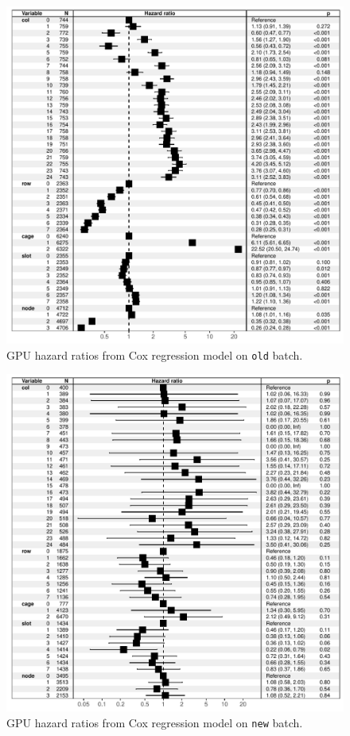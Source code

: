 \begin{figure}
  \includegraphics[width=6.5in]{figs/cox_o001.pdf}
  \caption{GPU hazard ratios from Cox regression model on {\tt old}
    batch.}
\end{figure}
\begin{figure}
  \includegraphics[width=6.5in]{figs/cox_n001.pdf}
  \caption{GPU hazard ratios from Cox regression model on {\tt new}
    batch.}
\end{figure}


